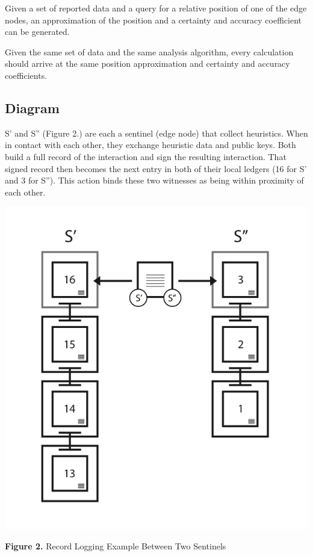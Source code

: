 \documentclass{article}
\begin{document}
Given a set of reported data and a query for a relative position of one of the edge nodes, an approximation of the position and a certainty and accuracy coefficient can be generated.

Given the same set of data and the same analysis algorithm, every calculation should arrive at the same position approximation and certainty and accuracy coefficients.

\subsection {Diagram}
S' and S'' (Figure 2.) are each a \Gls{sentinel} (edge node) that collect \glspl{heuristic}. When in contact with each other, they exchange heuristic data and public keys. Both build a full record of the interaction and sign the resulting interaction. That signed record then becomes the next entry in both of their local ledgers (16 for S' and 3 for S''). This action binds these two witnesses as being within proximity of each other.

\includegraphics [width=\textwidth]{boundwitness}
\begin{center}\textbf{Figure 2.}  Record Logging Example Between Two Sentinels
\end{center}
\end{document}
